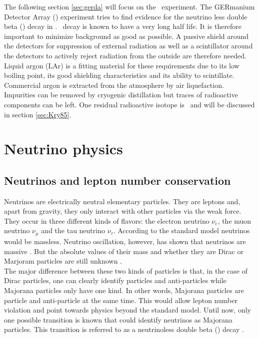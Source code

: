 \documentclass[encoding=utf8,british]{tumphthesis}
\begin{document}
The following section \ref{sec:gerda} will focus on the \gerda\ experiment.
The GERmanium Detector Array (\gerda) experiment tries to find evidence for the neutrino less double beta (\onbb) decay in .
\onbb\ decay is known to have a very long half life.
It is therefore important to minimize background as good as possible. 
A passive shield around the detectors for suppression of external radiation as well as a scintillator around the detectors to actively reject radiation from the outside are therefore needed.
Liquid argon (LAr) is a fitting material for these requirements due to its low boiling point, its good shielding characteristics and its ability to scintillate. 
Commercial argon is extracted from the atmosphere by air liquefaction. 
Impurities can be removed by cryogenic distillation but traces of radioactive components can be left.
One residual radioactive isotope is \Kr\ and  will be discussed in section \ref{sec:Kry85}. 
\\


\section{Neutrino physics}
\label{sec:PhyBG}

\subsection{Neutrinos and lepton number conservation}

Neutrinos are electrically neutral elementary particles.
They are leptons and, apart from gravity, they only interact with other particles via the weak force.
They occur in three different kinds of flavors: the electron neutrino $\nu_e$, the muon neutrino $\nu_{\mu}$ and the tau neutrino $\nu_{\tau}$.
According to the standard model neutrinos would be massless.
Neutrino oscillation, however, has shown that neutrinos are massive \cite{fukuda_evidence_1998}.
But the absolute values of their mass and whether they are Dirac or Marjoram particles are still unknown \cite{barabash_brief_2017}.
\\

The major difference between these two kinds of particles is that, in the case of Dirac particles, one can clearly identify particles and anti-particles while Majorana particles only have one kind.
In other words, Majorana particles are particle and anti-particle at the same time.
This would allow lepton number violation and point towards physics beyond the standard model.
Until now, only one possible transition is known that could identify neutrinos as Majorana particles.
This transition is referred to as a neutrinoless double beta (\onbb) decay \cite{schechter_neutrinoless_1982}.
 
\end{document}
